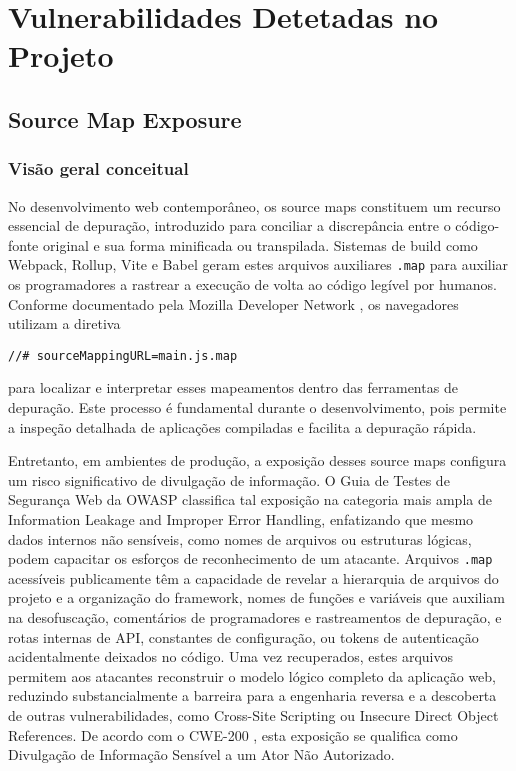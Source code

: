 \section{Vulnerabilidades Detetadas no Projeto}
\label{sec:vulnerabilidades-detetadas}

\subsection{Source Map Exposure}
\label{subsec:source-map-explosure}

\subsubsection{Visão geral conceitual}
\label{subsubsec:visao-geral-SME}

No desenvolvimento web contemporâneo, os source maps constituem um recurso essencial de depuração, introduzido para conciliar a discrepância entre o código-fonte original e sua forma minificada ou transpilada. Sistemas de build como Webpack, Rollup, Vite e Babel geram estes arquivos auxiliares \texttt{.map} para auxiliar os programadores a rastrear a execução de volta ao código legível por humanos. Conforme documentado pela Mozilla Developer Network \cite{ref42}, os navegadores utilizam a diretiva  

\begin{verbatim}
//# sourceMappingURL=main.js.map
\end{verbatim}

para localizar e interpretar esses mapeamentos dentro das ferramentas de depuração. Este processo é fundamental durante o desenvolvimento, pois permite a inspeção detalhada de aplicações compiladas e facilita a depuração rápida. 

Entretanto, em ambientes de produção, a exposição desses source maps configura um risco significativo de divulgação de informação. O Guia de Testes de Segurança Web da OWASP \cite{ref2} classifica tal exposição na categoria mais ampla de Information Leakage and Improper Error Handling, enfatizando que mesmo dados internos não sensíveis, como nomes de arquivos ou estruturas lógicas, podem capacitar os esforços de reconhecimento de um atacante. Arquivos \texttt{.map} acessíveis publicamente têm a capacidade de revelar a hierarquia de arquivos do projeto e a organização do framework, nomes de funções e variáveis que auxiliam na desofuscação, comentários de programadores e rastreamentos de depuração, e rotas internas de API, constantes de configuração, ou tokens de autenticação acidentalmente deixados no código. Uma vez recuperados, estes arquivos permitem aos atacantes reconstruir o modelo lógico completo da aplicação web, reduzindo substancialmente a barreira para a engenharia reversa e a descoberta de outras vulnerabilidades, como Cross-Site Scripting ou Insecure Direct Object References. De acordo com o CWE-200 \cite{ref43}, esta exposição se qualifica como Divulgação de Informação Sensível a um Ator Não Autorizado. 

